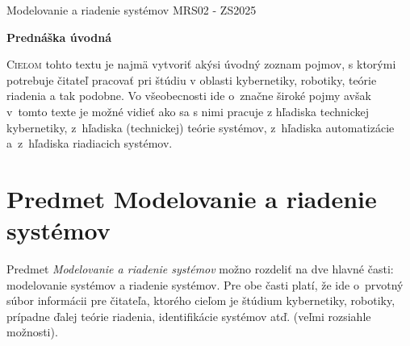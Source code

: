 \documentclass[a4paper, 10pt, ]{article}
\def\oznacenieCasti{MRS02 - ZS2025}
\begin{document}
\lstset{%
style=mystyle,
rangebeginprefix=\#\#\#\ cellB\ ,%
rangebeginsuffix=\ \#\#\#,%
rangeendprefix=\#\#\#\ cellE\ ,%
rangeendsuffix=\ \#\#\#,%
includerangemarker=false,
}





\fontsize{12pt}{22pt}\selectfont

\centerline{\textsf{Modelovanie a riadenie systémov} \hfill \textsf{\oznacenieCasti}}

\fontsize{18pt}{22pt}\selectfont





\begin{flushleft}
	\textbf{\textsf{Prednáška úvodná}}
\end{flushleft}






\normalsize

\bigskip

{\hypersetup{hidelinks}

\tableofcontents

}

\bigskip

\vspace{18pt}



\noindent
\lettrine[lines=3, nindent=0pt]{C}{ieľom} tohto textu je najmä vytvoriť akýsi úvodný zoznam pojmov, s ktorými potrebuje čitateľ pracovať pri štúdiu v oblasti kybernetiky, robotiky, teórie riadenia a tak podobne. Vo všeobecnosti ide o~značne široké pojmy avšak v~tomto texte je možné vidieť ako sa s nimi pracuje z hľadiska technickej kybernetiky, z~hľadiska (technickej) teórie systémov, z~hľadiska automatizácie a~z~hľadiska riadiacich systémov.








\section{Predmet Modelovanie a riadenie systémov}

Predmet \emph{Modelovanie a riadenie systémov} možno rozdeliť na dve hlavné časti: modelovanie systémov a riadenie systémov. Pre obe časti platí, že ide o~prvotný súbor informácii pre čitateľa, ktorého cieľom je štúdium kybernetiky, robotiky, prípadne ďalej teórie riadenia, identifikácie systémov atď. (veľmi rozsiahle možnosti).
\end{document}
